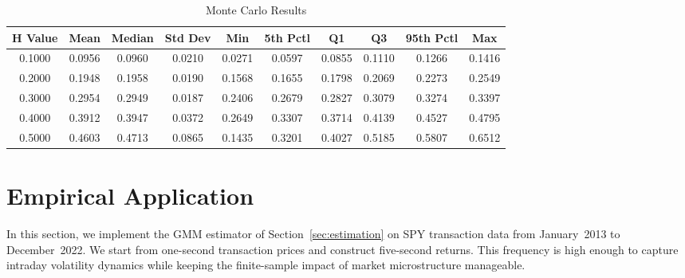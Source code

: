\documentclass[ecta,nameyear,draft]{econsocart}
\newcommand{\1}{\mathbf 1}
\numberwithin{equation}{section}
\begin{document}
\begin{table}[htbp]
\begin{tabular}{cccccccccc}
\toprule
\textbf{H Value} & \textbf{Mean} & \textbf{Median} & \textbf{Std Dev} & \textbf{Min} & \textbf{5th Pctl} & \textbf{Q1} & \textbf{Q3} & \textbf{95th Pctl} & \textbf{Max} \\
\midrule
0.1000 & 0.0956 & 0.0960 & 0.0210 & 0.0271 & 0.0597 & 0.0855 & 0.1110 & 0.1266 & 0.1416 \\
0.2000 & 0.1948 & 0.1958 & 0.0190 & 0.1568 & 0.1655 & 0.1798 & 0.2069 & 0.2273 & 0.2549 \\
0.3000 & 0.2954 & 0.2949 & 0.0187 & 0.2406 & 0.2679 & 0.2827 & 0.3079 & 0.3274 & 0.3397 \\
0.4000 & 0.3912 & 0.3947 & 0.0372 & 0.2649  & 0.3307 & 0.3714 & 0.4139 & 0.4527 & 0.4795 \\
0.5000 & 0.4603 & 0.4713 & 0.0865 & 0.1435 & 0.3201 & 0.4027 & 0.5185 & 0.5807 & 0.6512 \\
\bottomrule
\end{tabular}
        \caption{Monte Carlo Results}
        \label{tab:mc}
\end{table}















































\section{Empirical Application}
\label{sec:data}


In this section, we implement the GMM estimator of Section~\ref{sec:estimation} on SPY transaction data from January~2013 to December~2022. We start from one-second transaction prices and construct five-second returns. This frequency is high enough to capture intraday volatility dynamics while keeping the finite-sample impact of market microstructure manageable.
\end{document}
